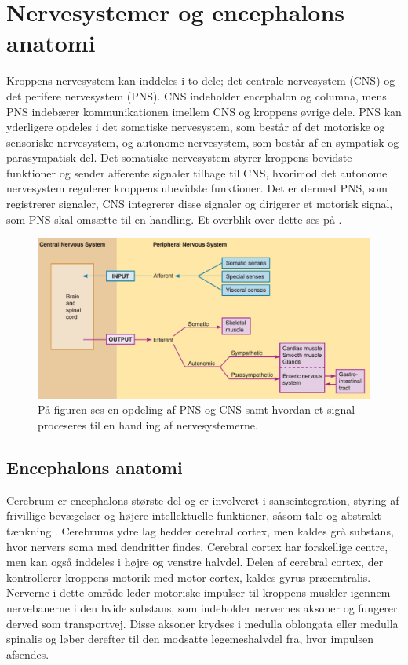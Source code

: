 \chapter{Nervesystemer og encephalons anatomi}\label{AppNerve}
Kroppens nervesystem kan inddeles i to dele; det centrale nervesystem (CNS) og det perifere nervesystem (PNS). CNS indeholder encephalon og columna, mens PNS indebærer kommunikationen imellem CNS og kroppens øvrige dele. PNS kan yderligere opdeles i det somatiske nervesystem, som består af det motoriske og sensoriske nervesystem, og autonome nervesystem, som består af en sympatisk og parasympatisk del. Det somatiske nervesystem styrer kroppens bevidste funktioner og sender afferente signaler tilbage til CNS, hvorimod det autonome nervesystem regulerer kroppens ubevidste funktioner. Det er dermed PNS, som registrerer signaler, CNS integrerer disse signaler og dirigerer et motorisk signal, som PNS skal omsætte til en handling. \cite{Martini2012,Stanfield2014} Et overblik over dette ses på .

\begin{figure}[H]
	\centering
	\includegraphics[scale=0.5]{figures/bProblemanalyse/Nervesys1.png}
	\caption{På figuren ses en opdeling af PNS og CNS samt hvordan et signal proceseres til en handling af nervesystemerne. \cite{Stanfield2014}}
	\label{Nersys}
\end{figure}

\section{Encephalons anatomi}
Cerebrum er encephalons største del og er involveret i sanseintegration, styring af frivillige bevægelser og højere intellektuelle funktioner, såsom tale og abstrakt tænkning \cite{Academic2015b}. Cerebrums ydre lag hedder cerebral cortex, men kaldes grå substans, hvor nervers soma med dendritter findes. Cerebral cortex har forskellige centre, men kan også inddeles i højre og venstre halvdel. Delen af cerebral cortex, der kontrollerer kroppens motorik med motor cortex, kaldes gyrus præcentralis. Nerverne i dette område leder motoriske impulser til kroppens muskler igennem nervebanerne i den hvide substans, som indeholder nervernes aksoner og fungerer derved som transportvej. \cite{Martini2012,Stanfield2014,Academic2015b} Disse aksoner krydses i medulla oblongata eller medulla spinalis og løber derefter til den modsatte legemeshalvdel fra, hvor impulsen afsendes. \cite{Martini2012}


